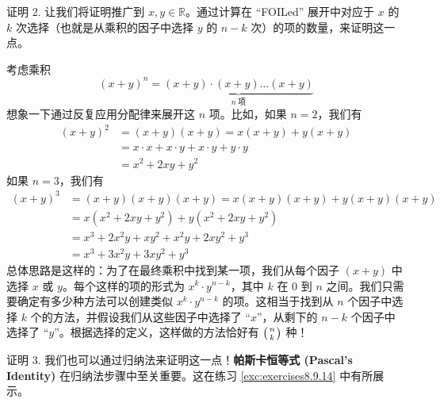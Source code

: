 \begin{proofs}{证明 2.}
    让我们将证明推广到 $x, y \in \mathbb{R}$。通过计算在 ``FOILed'' 展开中对应于 $x$ 的 $k$ 次选择（也就是从乘积的因子中选择 $y$ 的 $n - k$ 次）的项的数量，来证明这一点。

    考虑乘积
    \[(x+y)^n = \underbrace{(x+y) \cdot (x+y) \dots (x+y)}_{n \;\text{项}}\]
    想象一下通过反复应用分配律来展开这 $n$ 项。比如，如果 $n=2$，我们有
    \begin{align*}
        (x+y)^2 & = (x+y)(x+y) = x(x+y)+y(x+y)                    \\
                & = x \cdot x + x \cdot y + x \cdot y + y \cdot y \\
                & = x^2+2xy+y^2
    \end{align*}
    如果 $n=3$，我们有
    \begin{align*}
        (x+y)^3 & = (x+y)(x+y)(x+y) = x(x+y)(x+y) + y(x+y)(x+y) \\
                & = x(x^2+2xy+y^2) + y(x^2+2xy+y^2)             \\
                & = x^3 + 2x^2y + xy^2 + x^2y + 2xy^2 + y^3     \\
                & = x^3 + 3x^2y + 3xy^2 +y^3
    \end{align*}
    总体思路是这样的：为了在最终乘积中找到某一项，我们从每个因子 $(x + y)$ 中选择 $x$ 或 $y$。每个这样的项的形式为 $x^k \cdot y^{n-k}$，其中 $k$ 在 $0$ 到 $n$ 之间。我们只需要确定有多少种方法可以创建类似 $x^k \cdot y^{n-k}$ 的项。这相当于找到从 $n$ 个因子中选择 $k$ 个的方法，并假设我们从这些因子中选择了 ``$x$''，从剩下的 $n - k$ 个因子中选择了 ``$y$''。根据选择的定义，这样做的方法恰好有 $\big({n \atop k}\big)$ 种！
\end{proofs}

\begin{proofs}{证明 3.}
    我们也可以通过归纳法来证明这一点！\textbf{帕斯卡恒等式 (Pascal's Identity)} 在归纳法步骤中至关重要。这在练习 \ref{exc:exercises8.9.14} 中有所展示。
\end{proofs}

